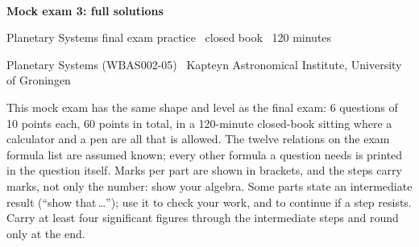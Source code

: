 
\newcommand{\pts}[1]{{\normalfont\small\bfseries\color{ipsAccent}[#1~pts]}\enspace}

\thispagestyle{fancy}

\begingroup
\noindent{\color{ipsAccent}\rule{\linewidth}{1.2pt}}\\[8pt]
{\LARGE\bfseries\color{ipsPrimary} Mock exam 3\ifipssolutions: full solutions\fi\par}
\vskip7pt
{\normalsize\color{ipsAccent} Planetary Systems final exam practice \textbullet\ closed book \textbullet\ 120 minutes\par}
\vskip3pt
{\footnotesize Planetary Systems (WBAS002-05) \textbullet\ Kapteyn Astronomical Institute, University of Groningen\par}
\vskip7pt
\noindent{\color{ipsAccent}\rule{\linewidth}{0.6pt}}
\vskip10pt
\endgroup

This mock exam has the same shape and level as the final exam: 6 questions of 10 points each, 60 points in total, in a 120-minute closed-book sitting where a calculator and a pen are all that is allowed.
The twelve relations on the exam formula list are assumed known; every other formula a question needs is printed in the question itself.
Marks per part are shown in brackets, and the steps carry marks, not only the number: show your algebra.
Some parts state an intermediate result (``show that\,\ldots''); use it to check your work, and to continue if a step resists.
Carry at least four significant figures through the intermediate steps and round only at the end.

